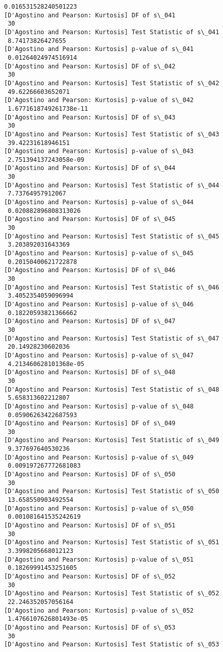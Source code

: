 \documentclass[11pt]{article}
\begin{document}
\begin{Verbatim}[commandchars=\\\{\}]
 0.016531528240501223
[D'Agostino and Pearson: Kurtosis] DF of s\_041
 30
[D'Agostino and Pearson: Kurtosis] Test Statistic of s\_041
 8.74173826427655
[D'Agostino and Pearson: Kurtosis] p-value of s\_041
 0.01264024974516914
[D'Agostino and Pearson: Kurtosis] DF of s\_042
 30
[D'Agostino and Pearson: Kurtosis] Test Statistic of s\_042
 49.62266603652071
[D'Agostino and Pearson: Kurtosis] p-value of s\_042
 1.6771618749261738e-11
[D'Agostino and Pearson: Kurtosis] DF of s\_043
 30
[D'Agostino and Pearson: Kurtosis] Test Statistic of s\_043
 39.42231618946151
[D'Agostino and Pearson: Kurtosis] p-value of s\_043
 2.751394137243058e-09
[D'Agostino and Pearson: Kurtosis] DF of s\_044
 30
[D'Agostino and Pearson: Kurtosis] Test Statistic of s\_044
 7.73764957912067
[D'Agostino and Pearson: Kurtosis] p-value of s\_044
 0.020882896808313026
[D'Agostino and Pearson: Kurtosis] DF of s\_045
 30
[D'Agostino and Pearson: Kurtosis] Test Statistic of s\_045
 3.203892031643369
[D'Agostino and Pearson: Kurtosis] p-value of s\_045
 0.20150400621722878
[D'Agostino and Pearson: Kurtosis] DF of s\_046
 30
[D'Agostino and Pearson: Kurtosis] Test Statistic of s\_046
 3.4052354059096994
[D'Agostino and Pearson: Kurtosis] p-value of s\_046
 0.18220593821366662
[D'Agostino and Pearson: Kurtosis] DF of s\_047
 30
[D'Agostino and Pearson: Kurtosis] Test Statistic of s\_047
 20.14928230602036
[D'Agostino and Pearson: Kurtosis] p-value of s\_047
 4.213460628101368e-05
[D'Agostino and Pearson: Kurtosis] DF of s\_048
 30
[D'Agostino and Pearson: Kurtosis] Test Statistic of s\_048
 5.658313602212807
[D'Agostino and Pearson: Kurtosis] p-value of s\_048
 0.05906263422687593
[D'Agostino and Pearson: Kurtosis] DF of s\_049
 30
[D'Agostino and Pearson: Kurtosis] Test Statistic of s\_049
 9.377697640530236
[D'Agostino and Pearson: Kurtosis] p-value of s\_049
 0.009197267772681083
[D'Agostino and Pearson: Kurtosis] DF of s\_050
 30
[D'Agostino and Pearson: Kurtosis] Test Statistic of s\_050
 13.658550903492554
[D'Agostino and Pearson: Kurtosis] p-value of s\_050
 0.001081641535242619
[D'Agostino and Pearson: Kurtosis] DF of s\_051
 30
[D'Agostino and Pearson: Kurtosis] Test Statistic of s\_051
 3.3998205668012123
[D'Agostino and Pearson: Kurtosis] p-value of s\_051
 0.18269991453251605
[D'Agostino and Pearson: Kurtosis] DF of s\_052
 30
[D'Agostino and Pearson: Kurtosis] Test Statistic of s\_052
 22.246352057056164
[D'Agostino and Pearson: Kurtosis] p-value of s\_052
 1.4766107626801493e-05
[D'Agostino and Pearson: Kurtosis] DF of s\_053
 30
[D'Agostino and Pearson: Kurtosis] Test Statistic of s\_053

\end{Verbatim}
\end{document}
